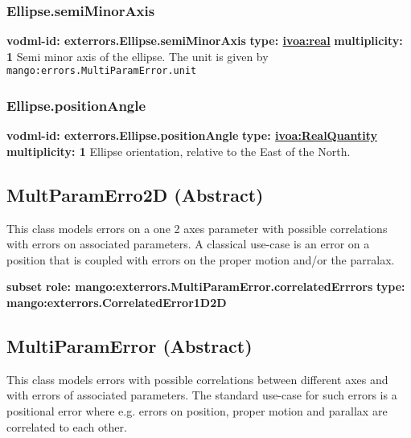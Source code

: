     \subsubsection{Ellipse.semiMinorAxis}
      \textbf{vodml-id: exterrors.Ellipse.semiMinorAxis} \newline
      \textbf{type: \hyperref[sect:ivoa]{ivoa:real}} \newline
      \textbf{multiplicity: 1} \newline 
      Semi minor axis of the ellipse. The unit is given by \texttt{mango:errors.MultiParamError.unit}

    \subsubsection{Ellipse.positionAngle}
      \textbf{vodml-id: exterrors.Ellipse.positionAngle} \newline
      \textbf{type: \hyperref[sect:ivoa]{ivoa:RealQuantity}} \newline
      \textbf{multiplicity: 1} \newline 
      Ellipse orientation, relative to the East of the North.

  \subsection{MultParamErro2D (Abstract)}
  \label{sect:exterrors.MultParamErro2D}
    This class models errors on a one 2 axes parameter with possible correlations with errors on associated parameters. A classical use-case is an error on a position that is coupled with errors on the proper motion and/or the parralax.

    \noindent \textbf{subset} \newline
    \indent   \textbf{role: mango:exterrors.MultiParamError.correlatedErrrors} \newline
    \indent   \textbf{type:  mango:exterrors.CorrelatedError1D2D} \newline


  \subsection{MultiParamError (Abstract)}
  \label{sect:exterrors.MultiParamError}
    This class models errors with possible correlations between different axes and with errors of associated parameters. The standard use-case for such errors is a positional error where e.g. errors on position, proper motion and parallax are correlated to each other.

